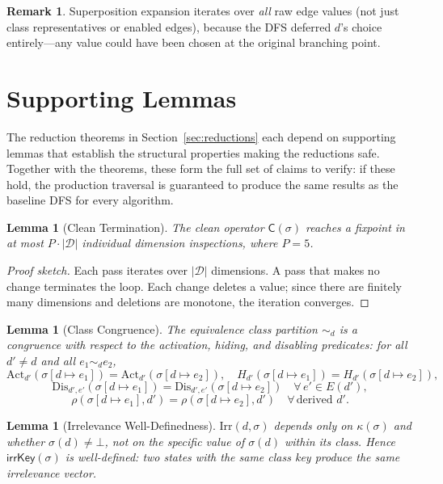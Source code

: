 \documentclass[11pt]{article}
\newtheorem{lemma}[theorem]{Lemma}
\theoremstyle{definition}
\newtheorem{remark}[theorem]{Remark}
\newcommand{\Dim}{\mathcal{D}}         %
\newcommand{\Edg}[1]{E(#1)}            %
\newcommand{\sel}{\sigma}              %
\newcommand{\clean}{\mathsf{C}}        %
\newcommand{\res}[2]{\rho(#1,#2)}      %
\newcommand{\ik}{\mathsf{irrKey}}      %
\newcommand{\ck}{\kappa}               %
\newcommand{\Act}{\mathrm{Act}}        %
\newcommand{\Dis}{\mathrm{Dis}}        %
\newcommand{\Irr}{\mathrm{Irr}}        %
\begin{document}
\begin{remark}
Superposition expansion iterates over \emph{all} raw edge values (not
just class representatives or enabled edges), because the DFS deferred
$d$'s choice entirely---any value could have been chosen at the original
branching point.
\end{remark}


\section{Supporting Lemmas}\label{sec:lemmas}

The reduction theorems in Section~\ref{sec:reductions} each depend on
supporting lemmas that establish the structural properties making the
reductions safe. Together with the theorems, these form the full set of
claims to verify: if these hold, the production traversal is guaranteed to
produce the same results as the baseline DFS for every algorithm.

\begin{lemma}[Clean Termination]\label{lem:term}
The clean operator $\clean(\sel)$ reaches a fixpoint in at most
$P \cdot |\Dim|$ individual dimension inspections, where $P = 5$.
\end{lemma}

\begin{proof}[Proof sketch]
Each pass iterates over $|\Dim|$ dimensions. A pass that makes no change
terminates the loop. Each change deletes a value; since there are
finitely many dimensions and deletions are monotone, the iteration
converges.
\end{proof}

\begin{lemma}[Class Congruence]\label{lem:congruence}
The equivalence class partition $\sim_d$ is a congruence with respect to
the activation, hiding, and disabling predicates: for all $d' \neq d$ and
all $e_1 \sim_d e_2$,
\[
  \Act_{d'}(\sel[d \mapsto e_1]) = \Act_{d'}(\sel[d \mapsto e_2]),\quad
  H_{d'}(\sel[d \mapsto e_1]) = H_{d'}(\sel[d \mapsto e_2]),
\]
\[
  \Dis_{d',e'}(\sel[d \mapsto e_1]) = \Dis_{d',e'}(\sel[d \mapsto e_2])
  \quad \forall\, e' \in \Edg{d'},
\]
\[
  \res{\sel[d \mapsto e_1]}{d'} = \res{\sel[d \mapsto e_2]}{d'}
  \quad \forall\, \text{derived } d'.
\]
\end{lemma}

\begin{lemma}[Irrelevance Well-Definedness]\label{lem:irr-wd}
$\Irr(d,\sel)$ depends only on $\ck(\sel)$ and whether $\sel(d) \neq
\bot$, not on the specific value of $\sel(d)$ within its class. Hence
$\ik(\sel)$ is well-defined: two states with the same class key produce
the same irrelevance vector.
\end{lemma}
\end{document}
